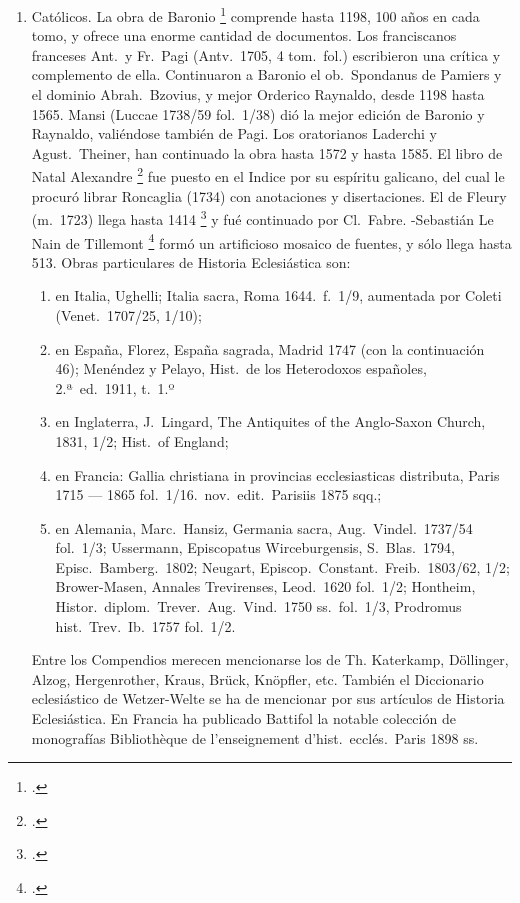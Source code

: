 \raggedbottom{} \documentclass[12pt, a4paper]{book}
\begin{document}
\begin{enumerate}
  \item Católicos. La obra de Baronio \footcite{Baronio1588Annales} comprende hasta 1198, 100 años en cada tomo, y ofrece una enorme cantidad de documentos. Los franciscanos franceses Ant.\ y Fr.\ Pagi (Antv.\ 1705, 4 tom.\ fol.) escribieron una crítica y complemento de ella. Continuaron a Baronio el ob.\ Spondanus de Pamiers y el dominio Abrah.\ Bzovius, y mejor Orderico Raynaldo, desde 1198 hasta 1565. Mansi (Luccae 1738/59 fol.\ 1/38) dió la mejor edición de Baronio y Raynaldo, valiéndose también de Pagi. Los oratorianos Laderchi y Agust.\ Theiner, han continuado la obra hasta 1572 y hasta 1585. El libro de Natal Alexandre \footcite{Natal1676Selecta} fue puesto en el Indice por su espíritu galicano, del cual le procuró librar Roncaglia (1734) con anotaciones y disertaciones. El de Fleury (m.\ 1723) llega hasta 1414 \footcite{FleuryFabre1691Histoire} y fué continuado por Cl.\ Fabre. -Sebastián Le Nain de Tillemont \footcite{Tillemont1693Mem} formó un artificioso mosaico de fuentes, y sólo llega hasta 513. Obras particulares de Historia Eclesiástica son:\begin{enumerate}
          \item en Italia, Ughelli; Italia sacra, Roma 1644.\ f.\ 1/9, aumentada por Coleti (Venet.\ 1707/25, 1/10);
          \item en España, Florez, España sagrada, Madrid 1747 (con la continuación 46); Menéndez y Pelayo, Hist.\ de los Heterodoxos españoles, 2.ª\ ed.\ 1911, t.\ 1.º\
          \item en Inglaterra, J.\ Lingard, The Antiquites of the Anglo-Saxon Church, 1831, 1/2; Hist.\ of England;
          \item en Francia: Gallia christiana in provincias ecclesiasticas distributa, Paris 1715 --- 1865 fol.\ 1/16.\ nov.\ edit.\ Parisiis 1875 sqq.;
          \item en Alemania, Marc.\ Hansiz, Germania sacra, Aug.\ Vindel.\ 1737/54 fol.\ 1/3; Ussermann, Episcopatus Wirceburgensis, S.\ Blas.\ 1794, Episc.\ Bamberg.\ 1802; Neugart, Episcop.\ Constant.\ Freib.\ 1803/62, 1/2; Brower-Masen, Annales Trevirenses, Leod.\ 1620 fol.\ 1/2; Hontheim, Histor.\ diplom.\ Trever.\ Aug.\ Vind.\ 1750 ss.\ fol.\ 1/3, Prodromus hist.\ Trev.\ Ib.\ 1757 fol.\ 1/2.
        \end{enumerate}
        Entre los Compendios merecen mencionarse los de Th. Katerkamp, Döllinger, Alzog, Hergenrother, Kraus, Brück, Knöpfler, etc. También el Diccionario eclesiástico de Wetzer-Welte se ha de mencionar por sus artículos de Historia Eclesiástica. En Francia ha publicado Battifol la notable colección de monografías Bibliothèque de l'enseignement d'hist.\ ecclés.\ Paris 1898 ss.

\end{enumerate}
\end{document}
